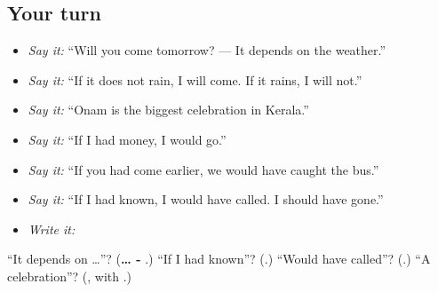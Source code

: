\subsection*{Your turn}
\begin{itemize}
\raggedright
  \item \emph{Say it:} \textquotedblleft{}Will you come tomorrow? — It depends on the weather.\textquotedblright{}
  \item \emph{Say it:} \textquotedblleft{}If it does not rain, I will come. If it rains, I will not.\textquotedblright{}
  \item \emph{Say it:} \textquotedblleft{}Onam is the biggest celebration in Kerala.\textquotedblright{}
  \item \emph{Say it:} \textquotedblleft{}If I had money, I would go.\textquotedblright{}
  \item \emph{Say it:} \textquotedblleft{}If you had come earlier, we would have caught the bus.\textquotedblright{}
  \item \emph{Say it:} \textquotedblleft{}If I had known, I would have called. I should have gone.\textquotedblright{}
  \item \emph{Write it:} \textbf{}
\end{itemize}

\begin{tcolorbox}[breakable,colback=teal!4,colframe=teal!35!black,title={Before you move on}]
\textquotedblleft{}It depends on …\textquotedblright{}? (\textbf{… - }.) \textquotedblleft{}If I had known\textquotedblright{}? (\textbf{}.) \textquotedblleft{}Would have called\textquotedblright{}? (\textbf{}.) \textquotedblleft{}A celebration\textquotedblright{}? (\textbf{}, with \textbf{}.)
\end{tcolorbox}
